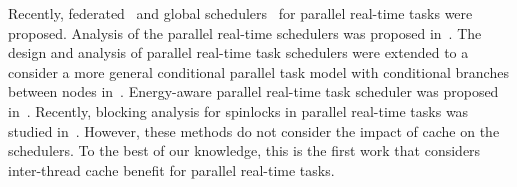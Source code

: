 Recently, federated~\cite{li2014federated, baruah2015federated, ueter2018reservation} and global schedulers~\cite{saifullah2013multi, lakshmanan2010scheduling, baruah2015global} for parallel real-time tasks were proposed. Analysis of the parallel real-time schedulers was proposed in~\cite{li2013, li2014analysis, bonifaci2013feasibility, andersson2012analyzing, baruah2014improved, serrano2016response}. The design and analysis of parallel real-time task schedulers were extended to a consider a more general conditional parallel task model with conditional branches between nodes in~\cite{melani2015response, baruah2015federated, sun2018capacity}. Energy-aware parallel real-time task scheduler was proposed in~\cite{guo2017energy}. Recently, blocking analysis for spinlocks in parallel real-time tasks was studied in~\cite{dinh2018blocking}. However, these methods do not consider the impact of cache on the schedulers. To the best of our knowledge, this is the first work that considers inter-thread cache benefit for parallel real-time tasks.
 











